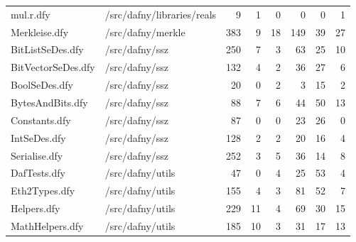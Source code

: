 \documentclass[a4paper, 12pt]{article}
\begin{document}
\begin{tabular}{llrrrrrr}
                       mul.r.dfy &                      /src/dafny/libraries/reals &     9 &         1 &                0 &              0 &              0 &       1 \\
                   Merkleise.dfy &                               /src/dafny/merkle &   383 &         9 &               18 &            149 &             39 &      27 \\
                BitListSeDes.dfy &                                  /src/dafny/ssz &   250 &         7 &                3 &             63 &             25 &      10 \\
              BitVectorSeDes.dfy &                                  /src/dafny/ssz &   132 &         4 &                2 &             36 &             27 &       6 \\
                   BoolSeDes.dfy &                                  /src/dafny/ssz &    20 &         0 &                2 &              3 &             15 &       2 \\
                BytesAndBits.dfy &                                  /src/dafny/ssz &    88 &         7 &                6 &             44 &             50 &      13 \\
                   Constants.dfy &                                  /src/dafny/ssz &    87 &         0 &                0 &             23 &             26 &       0 \\
                    IntSeDes.dfy &                                  /src/dafny/ssz &   128 &         2 &                2 &             20 &             16 &       4 \\
                   Serialise.dfy &                                  /src/dafny/ssz &   252 &         3 &                5 &             36 &             14 &       8 \\
                    DafTests.dfy &                                /src/dafny/utils &    47 &         0 &                4 &             25 &             53 &       4 \\
                   Eth2Types.dfy &                                /src/dafny/utils &   155 &         4 &                3 &             81 &             52 &       7 \\
                     Helpers.dfy &                                /src/dafny/utils &   229 &        11 &                4 &             69 &             30 &      15 \\
                 MathHelpers.dfy &                                /src/dafny/utils &   185 &        10 &                3 &             31 &             17 &      13 \\

\end{tabular}
\end{document}
